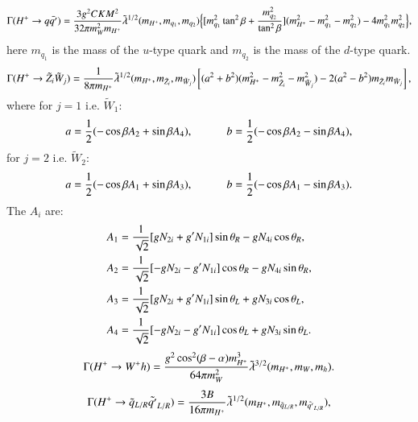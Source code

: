\documentclass[final,3p,times]{elsarticle}
\begin{document}
\begin{equation}\label{Hpmqq}
\Gamma(H^+ \rightarrow q \bar{q'}) = {3 g^2 CKM^2 \over 32 \pi m_{W}^2 m_{H^+}} \tilde{\lambda}^{1/2}(m_{H^+},m_{q_1}, m_{q_2}) \Big\{[m_{q_1}^2 \tan^2 \beta + {m_{q_2}^2  \over \tan^2 \beta}] (m_{H^+}^2 - m_{q_1}^2 - m_{q_2}^2) - 4m_{q_1}^2 m_{q_2}^2\Big\},
\end{equation} 
here $m_{q_1}$ is the mass of the $u$-type quark and $m_{q_2}$ is the mass of the $d$-type quark.
\begin{equation}\label{Hpmneutch}
\Gamma(H^+ \rightarrow \tilde{Z}_i \tilde{W}_j) = {1 \over 8 \pi m_{H^+}} \tilde{\lambda}^{1/2}(m_{H^+},m_{\tilde{Z}_i}, m_{\tilde{W}_j})\left[(a^2 + b^2)(m_{H^+}^2 - m_{\tilde{Z}_i}^2 - m_{\tilde{W}_j}^2) -2(a^2 -b^2)m_{\tilde{Z}_i}m_{\tilde{W}_j}\right],
\end{equation} 
where
for $j=1$ i.e. $\tilde{W}_{1}$:
\begin{equation}
a = {1 \over 2} (-\cos\beta A_2 + \sin\beta A_4), \quad \quad \quad
b = {1 \over 2} (-\cos\beta A_2 - \sin\beta A_4),
\end{equation}
for $j=2$ i.e. $\tilde{W}_{2}$:
\begin{equation}
a = {1 \over 2}(-\cos\beta A_1 + \sin\beta A_3), \quad \quad \quad
b = {1 \over 2}(-\cos\beta A_1 - \sin\beta A_3).
\end{equation}
The $A_{i}$ are:
\begin{align}
A_1 &= {1 \over \sqrt{2}}[g N_{2i} + g' N_{1i}]\sin \theta_R - gN_{4i} \cos\theta_R ,\\
A_2 &= {1 \over \sqrt{2}}[-g N_{2i} - g' N_{1i}]\cos \theta_R - gN_{4i} \sin\theta_R, \\
A_3 &= {1 \over \sqrt{2}}[g N_{2i} + g' N_{1i}]\sin \theta_L + gN_{3i} \cos\theta_L, \\
A_4 &= {1 \over \sqrt{2}}[-g N_{2i} - g' N_{1i}]\cos \theta_L + gN_{3i} \sin\theta_L.
\end{align}
\begin{equation}\label{HpmWh}
\Gamma(H^+ \rightarrow W^+ h) = {g^2 \cos^2 (\beta-\alpha) m_{H^+}^3 \over 64 \pi m_{W}^2} \tilde{\lambda}^{3/2}(m_{H^+},m_W,m_h).
\end{equation} 
\begin{equation} \label{Hpmeqsq1}
\Gamma(H^+ \rightarrow \tilde{q}_{L/R} \tilde{q'}_{L/R}) = {3 B \over 16 \pi m_{H^+}} \tilde{\lambda}^{1/2}(m_{H^+},m_{\tilde{q}_{L/R}}, m_{\tilde{q'}_{L/R}}), 
\end{equation} 
\end{document}

